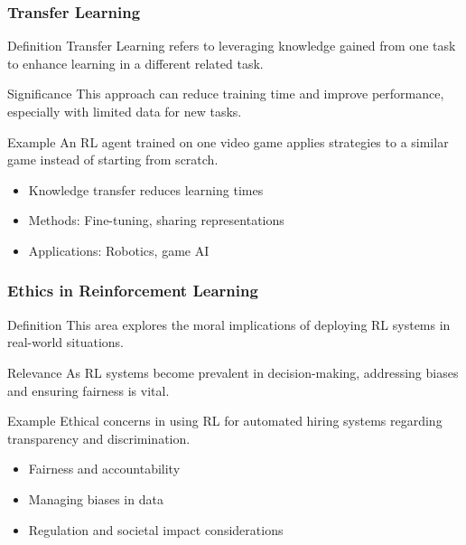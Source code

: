 \documentclass[aspectratio=169]{beamer}
\begin{document}
\begin{frame}[fragile]
    \frametitle{Transfer Learning}
    
    \begin{block}{Definition}
        Transfer Learning refers to leveraging knowledge gained from one task to enhance learning in a different related task.
    \end{block}
    
    \begin{block}{Significance}
        This approach can reduce training time and improve performance, especially with limited data for new tasks.
    \end{block}
    
    \begin{exampleblock}{Example}
        An RL agent trained on one video game applies strategies to a similar game instead of starting from scratch.
    \end{exampleblock}
    
    \begin{itemize}
        \item Knowledge transfer reduces learning times
        \item Methods: Fine-tuning, sharing representations
        \item Applications: Robotics, game AI
    \end{itemize}
\end{frame}

\begin{frame}[fragile]
    \frametitle{Ethics in Reinforcement Learning}
    
    \begin{block}{Definition}
        This area explores the moral implications of deploying RL systems in real-world situations.
    \end{block}
    
    \begin{block}{Relevance}
        As RL systems become prevalent in decision-making, addressing biases and ensuring fairness is vital.
    \end{block}
    
    \begin{exampleblock}{Example}
        Ethical concerns in using RL for automated hiring systems regarding transparency and discrimination.
    \end{exampleblock}
    
    \begin{itemize}
        \item Fairness and accountability
        \item Managing biases in data
        \item Regulation and societal impact considerations
    \end{itemize}
\end{frame}
\end{document}
